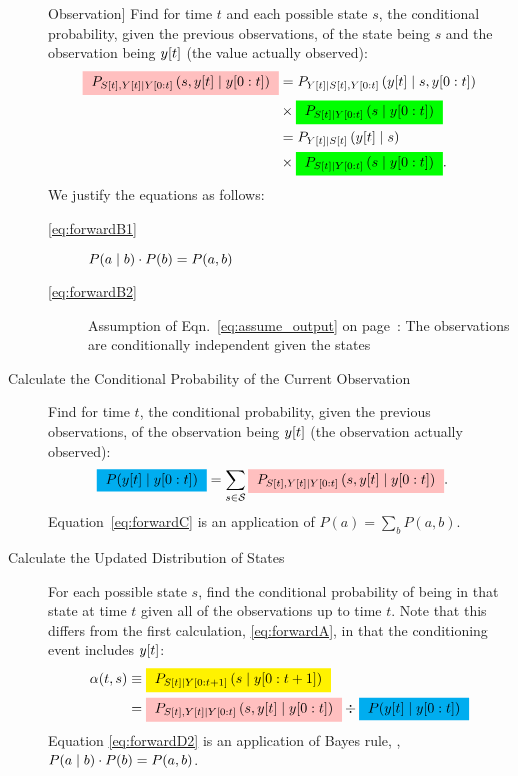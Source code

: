 \begin{description}
  Observation] Find for time $t$ and each possible state $s$, the
  conditional probability, given the previous observations, of the
  state being $s$ and the observation being ${y}{[t]}$ (the value
  actually observed):
  \begin{subequations}
    \label{eq:forwardB}
    \begin{align}
      \mlabel{eq:forwardB1}
      \JointForecast{S}{s}{t} &= P_{\ti{Y}{t} \given 
        \ti{S}{t},\ts{Y}{0}{t}}\left(\ti{y}{t} \given s, \ts{y}{0}{t}
      \right) \nonumber \\& \times \StateForecast{S}{s}{t}\\
      \mlabel{eq:forwardB2}
      &= P_{\ti{Y}{t} \given  \ti{S}{t}}\left(\ti{y}{t} \given s
        \right) \nonumber \\
      & \times \StateForecast{S}{s}{t} .
    \end{align}
  \end{subequations}
We justify the equations as follows:
\begin{description}
\item[\eqref{eq:forwardB1}]  $P(a\mid b)\cdot P(b) = P(a,b)$
\item[\eqref{eq:forwardB2}] Assumption of
  Eqn.~\eqref{eq:assume_output} on page~\pageref{eq:assume_output}:
  The observations are conditionally independent given the states
\end{description}
\item[Calculate the Conditional Probability of the Current Observation]
  Find for time $t$, the conditional probability, given the previous
  observations, of the observation being ${y}{[t]}$ (the observation actually
  observed):
  \begin{align}
    \mlabel{eq:forwardC}
    \gammax &= \sum_{s \in \states} \JointForecast{S}{s}{t} .
  \end{align}
Equation~\eqref{eq:forwardC} is an application of $P(a) = \sum_b P(a,b)$.
\item[Calculate the Updated Distribution of States] For each possible
  state $s$, find the conditional probability of being in that state
  at time $t$ given all of the observations up to time $t$.  Note that
  this differs from the first calculation, \eqref{eq:forwardA}, in that
  the conditioning event includes ${y}{[t]}$:%
  \begin{subequations}
    \label{eq:forwardD}
    \begin{align}
      \mlabel{eq:forwardD1}
      \alpha(t,s) &\equiv
      \alphax{S}{t}{t+1}{s} \\
      \mlabel{eq:forwardD2}
      &= \JointForecast{S}{s}{t} \div \gammax
    \end{align}
  \end{subequations}
  Equation \eqref{eq:forwardD2} is an application of Bayes rule, \ie,
  $P(a\mid b)\cdot P(b) = P(a,b)$.
\end{description}
